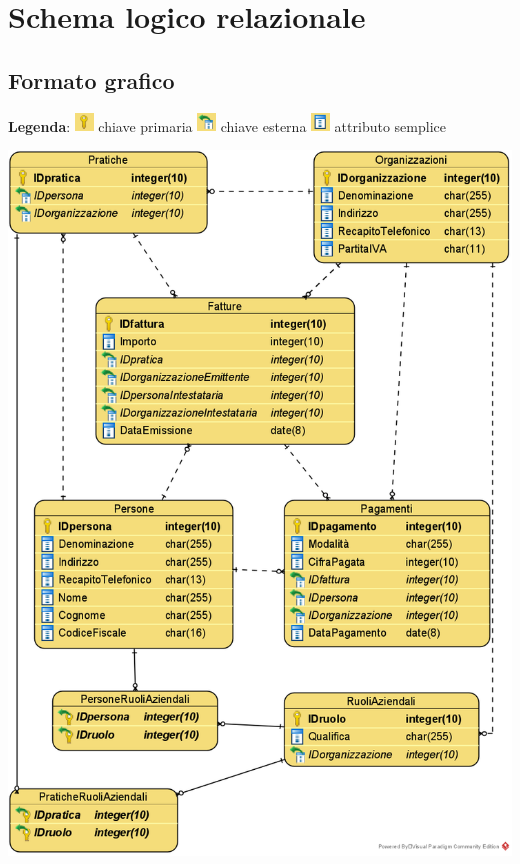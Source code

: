 \documentclass[a4paper,12pt]{article}
\begin{document}
 \section{ Schema logico relazionale }

 \subsection{ Formato grafico }

\begin{minipage}{\textwidth}
\textbf{Legenda}:
\includegraphics[width=0.5cm]{ Legenda chiave primaria.png } chiave primaria\hspace{1cm}
\includegraphics[width=0.5cm]{ Legenda chiave esterna.png } chiave esterna\hspace{1cm}
\includegraphics[width=0.5cm]{ Legenda attributo.png } attributo semplice

\begin{center}
\centering 
\centerline{
\includegraphics[width=\textwidth -4cm]{ Schema logico relazionale.png }
}
\end{center}
\end{minipage}
\end{document}
